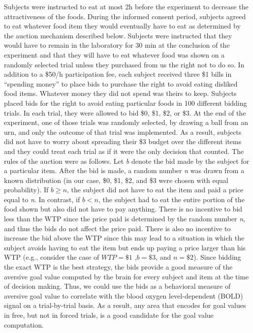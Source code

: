 \documentclass[12pt,article,oneside,a4paper]{memoir}
\begin{document}
Subjects were instructed to eat at most 2h before the experiment to decrease the
attractiveness of the foods. During the informed consent period, subjects agreed
to eat whatever food item they would eventually have to eat as determined by the
auction mechanism described below. Subjects were instructed that they would have
to remain in the laboratory for 30 min at the conclusion of the experiment and
that they will have to eat whatever food was shown on a randomly selected trial
unless they purchased from us the right not to do so. In addition to a \$50/h
participation fee, each subject received three \$1 bills in ``spending money''
to place bids to purchase the right to avoid eating disliked food items.
Whatever money they did not spend was theirs to keep.
Subjects placed bids for the right to avoid eating particular foods in 100
different bidding trials. In each trial, they were allowed to bid \$0, \$1, \$2,
or \$3. At the end of the experiment, one of those trials was randomly selected,
by drawing a ball from an urn, and only the outcome of that trial was implemented.
As a result, subjects did not have to worry about spreading their \$3 budget 
over the different items and they could treat each trial as if it were the only
decision that counted. The rules of the auction were as follows. Let \textit{b}
denote the bid made by the subject for a particular item. After the bid is made,
a random number \textit{n} was drawn from a known distribution (in our case, 
\$0, \$1, \$2, and \$3 were chosen with equal probability). If $b \geq n$, the
subject did not have to eat the item and paid a price equal to \textit{n}. In
contrast, if $b < n$, the subject had to eat the entire portion of the food
shown but also did not have to pay anything. 
There is no incentive to bid less than the WTP since the price paid is determined
by the random number \textit{n}, and thus the bids do not affect the price paid.
There is also no incentive to increase the bid above the WTP since this may lead
to a situation in which the subject avoids having to eat the item but ends up
paying a price larger than his WTP (e.g., consider the case of $WTP = \$1$ ,$b 
= \$3$, and $n = \$2$). Since bidding the exact WTP is the best strategy, the
bids provide a good measure of the aversive goal value computed by the brain for
every subject and item at the time of decision making. Thus, we could use the
bids as a behavioral measure of aversive goal value to correlate with the blood 
oxygen level-dependent (BOLD) signal on a trial-by-trial basis. As a result, any
area that encodes for goal values in free, but not in forced trials, is a good
candidate for the goal value computation.
\end{document}
